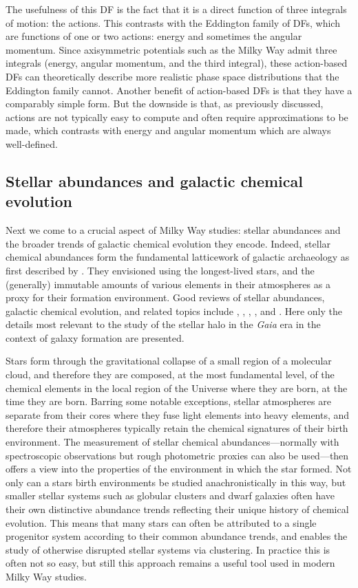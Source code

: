 The usefulness of this DF is the fact that it is a direct function of three integrals of motion: the actions. This contrasts with the Eddington family of DFs, which are functions of one or two actions: energy and sometimes the angular momentum. Since axisymmetric potentials such as the Milky Way admit three integrals (energy, angular momentum, and the third integral), these action-based DFs can theoretically describe more realistic phase space distributions that the Eddington family cannot. Another benefit of action-based DFs is that they have a comparably simple form. But the downside is that, as previously discussed, actions are not typically easy to compute and often require approximations to be made, which contrasts with energy and angular momentum which are always well-defined.

\subsection{Stellar abundances and galactic chemical evolution}

Next we come to a crucial aspect of Milky Way studies: stellar abundances and the broader trends of galactic chemical evolution they encode. Indeed, stellar chemical abundances form the fundamental latticework of galactic archaeology as first described by \textcite{freeman02}. They envisioned using the longest-lived stars, and the (generally) immutable amounts of various elements in their atmospheres as a proxy for their formation environment. Good reviews of stellar abundances, galactic chemical evolution, and related topics include  \textcite{tolstoy09}, \textcite{asplund09}, \textcite{nomoto13}, \textcite{frebel15}, and \textcite{kobayashi23}. Here only the details most relevant to the study of the stellar halo in the \textit{Gaia} era in the context of galaxy formation are presented.

Stars form through the gravitational collapse of a small region of a molecular cloud, and therefore they are composed, at the most fundamental level, of the chemical elements in the local region of the Universe where they are born, at the time they are born. Barring some notable exceptions, stellar atmospheres are separate from their cores where they fuse light elements into heavy elements, and therefore their atmospheres typically retain the chemical signatures of their birth environment. The measurement of stellar chemical abundances---normally with spectroscopic observations but rough photometric proxies can also be used---then offers a view into the properties of the environment in which the star formed. Not only can a stars birth environments be studied anachronistically in this way, but smaller stellar systems such as globular clusters and dwarf galaxies often have their own distinctive abundance trends reflecting their unique history of chemical evolution. This means that many stars can often be attributed to a single progenitor system according to their common abundance trends, and enables the study of otherwise disrupted stellar systems via clustering. In practice this is often not so easy, but still this approach remains a useful tool used in modern Milky Way studies.

